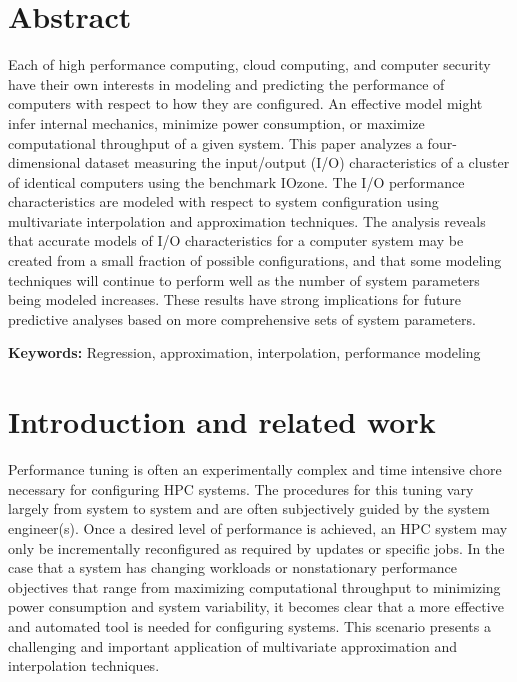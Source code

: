 \documentclass{scspaperproc}
\theoremstyle{scsthe}
\begin{document}
\maketitle

\vspace{-40pt}

\section*{Abstract}

Each of high performance computing, cloud computing, and computer
security have their own interests in modeling and predicting the
performance of computers with respect to how they are configured. An
effective model might infer internal mechanics, minimize power
consumption, or maximize computational throughput of a given
system. This paper analyzes a four-dimensional dataset measuring the
input/output (I/O) characteristics of a cluster of identical computers
using the benchmark IOzone. The I/O performance characteristics are
modeled with respect to system configuration using multivariate
interpolation and approximation techniques. The analysis reveals that
accurate models of I/O characteristics for a computer system may be
created from a small fraction of possible configurations, and that
some modeling techniques will continue to perform well as the number
of system parameters being modeled increases. These results have
strong implications for future predictive analyses based on more
comprehensive sets of system parameters.

\textbf{Keywords:} Regression, approximation, interpolation,
performance modeling


\section{Introduction and related work}
\label{sec:introduction}

Performance tuning is often an experimentally complex and time
intensive chore necessary for configuring HPC systems. The procedures
for this tuning vary largely from system to system and are often
subjectively guided by the system engineer(s). Once a desired level of
performance is achieved, an HPC system may only be incrementally
reconfigured as required by updates or specific jobs. In the case that
a system has changing workloads or nonstationary performance
objectives that range from maximizing computational throughput to
minimizing power consumption and system variability, it becomes clear
that a more effective and automated tool is needed for configuring
systems. This scenario presents a challenging and important
application of multivariate approximation and interpolation
techniques.
\end{document}
